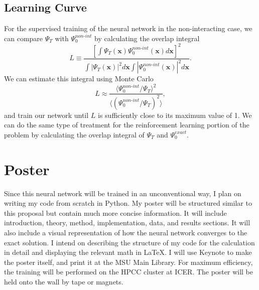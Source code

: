 \documentclass[prb,aps,twocolumn,showpacs,10pt]{revtex4-1}
\begin{document}

\subsection{Learning Curve}

For the supervised training of the neural network in the non-interacting case, we can compare $\Psi_T$ with $\Psi_0^{non\text{-}int}$ by calculating the overlap integral
\begin{equation}
L \equiv \frac{\left[ \int  \Psi_T(\bm{x}) \Psi_0^{non\text{-}int}(\bm{x}) d \bm{x} \right]^2}{\int |\Psi_T(\bm{x})|^2 d \bm{x} \int |\Psi_0^{non\text{-}int}(\bm{x})|^2 d \bm{x} }.
\end{equation}
We can estimate this integral using Monte Carlo
\begin{equation}
L \approx \frac{\langle \Psi_0^{non\text{-}int} /\Psi_T \rangle^2}{\langle  \left( \Psi_0^{non\text{-}int} /\Psi_T \right)^2 \rangle},
\end{equation}
and train our network until $L$ is sufficiently close to its maximum value of 1. We can do the same type of treatment for the reinforcement learning portion of the problem by calculating the overlap integral of $\Psi_T$ and $\Psi_0^{exact}$.


 \section{Poster}
 
Since this neural network will be trained in an unconventional way, I plan on writing my code from scratch in Python. My poster will be structured similar to this proposal but contain much more concise information. It will include introduction, theory, method, implementation, data, and results sections. It will also include a visual representation of how the neural network converges to the exact solution. I intend on describing the structure of my code for the calculation in detail and displaying the relevant math in LaTeX. I will use Keynote to make the poster itself, and print it at the MSU Main Library. For maximum efficiency, the training will be performed on the HPCC cluster at ICER. The poster will be held onto the wall by tape or magnets. 

\end{document}
